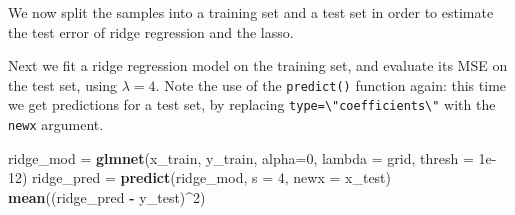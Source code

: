 \documentclass[]{article}
\newenvironment{Shaded}{\begin{snugshade}}{\end{snugshade}}
\newcommand{\KeywordTok}[1]{\textcolor[rgb]{0.13,0.29,0.53}{\textbf{#1}}}
\newcommand{\DataTypeTok}[1]{\textcolor[rgb]{0.13,0.29,0.53}{#1}}
\newcommand{\DecValTok}[1]{\textcolor[rgb]{0.00,0.00,0.81}{#1}}
\newcommand{\FloatTok}[1]{\textcolor[rgb]{0.00,0.00,0.81}{#1}}
\newcommand{\StringTok}[1]{\textcolor[rgb]{0.31,0.60,0.02}{#1}}
\newcommand{\OperatorTok}[1]{\textcolor[rgb]{0.81,0.36,0.00}{\textbf{#1}}}
\newcommand{\NormalTok}[1]{#1}
\begin{document}
We now split the samples into a training set and a test set in order to
estimate the test error of ridge regression and the lasso.

\begin{Shaded}
\end{Shaded}

Next we fit a ridge regression model on the training set, and evaluate
its MSE on the test set, using \(\lambda = 4\). Note the use of the
\texttt{predict()} function again: this time we get predictions for a
test set, by replacing
\texttt{type=\textbackslash{}"coefficients\textbackslash{}"} with the
\texttt{newx} argument.

\begin{Shaded}
\begin{Highlighting}[]
\NormalTok{ridge_mod =}\StringTok{ }\KeywordTok{glmnet}\NormalTok{(x_train, y_train, }\DataTypeTok{alpha=}\DecValTok{0}\NormalTok{, }\DataTypeTok{lambda =}\NormalTok{ grid, }\DataTypeTok{thresh =} \FloatTok{1e-12}\NormalTok{)}
\NormalTok{ridge_pred =}\StringTok{ }\KeywordTok{predict}\NormalTok{(ridge_mod, }\DataTypeTok{s =} \DecValTok{4}\NormalTok{, }\DataTypeTok{newx =}\NormalTok{ x_test)}
\KeywordTok{mean}\NormalTok{((ridge_pred }\OperatorTok{-}\StringTok{ }\NormalTok{y_test)}\OperatorTok{^}\DecValTok{2}\NormalTok{)}
\end{Highlighting}
\end{Shaded}
\end{document}
